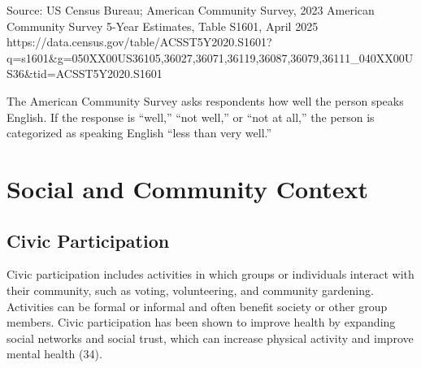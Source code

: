 \documentclass[
  english,
  letterpaper,
]{report}
\begin{document}
\begin{tcolorbox}[enhanced jigsaw, breakable, leftrule=.75mm, title=\textcolor{quarto-callout-note-color}{\faInfo}\hspace{0.5em}{Source}, bottomrule=.15mm, opacityback=0, left=2mm, colback=white, bottomtitle=1mm, coltitle=black, colbacktitle=quarto-callout-note-color!10!white, colframe=quarto-callout-note-color-frame, opacitybacktitle=0.6, toptitle=1mm, titlerule=0mm, arc=.35mm, rightrule=.15mm, toprule=.15mm]

Source: US Census Bureau; American Community Survey, 2023 American
Community Survey 5-Year Estimates, Table S1601, April 2025
https://data.census.gov/table/ACSST5Y2020.S1601?q=s1601\&g=050XX00US36105,36027,36071,36119,36087,36079,36111\_040XX00US36\&tid=ACSST5Y2020.S1601

\end{tcolorbox}

\begin{tcolorbox}[enhanced jigsaw, breakable, leftrule=.75mm, title=\textcolor{quarto-callout-note-color}{\faInfo}\hspace{0.5em}{Note}, bottomrule=.15mm, opacityback=0, left=2mm, colback=white, bottomtitle=1mm, coltitle=black, colbacktitle=quarto-callout-note-color!10!white, colframe=quarto-callout-note-color-frame, opacitybacktitle=0.6, toptitle=1mm, titlerule=0mm, arc=.35mm, rightrule=.15mm, toprule=.15mm]

The American Community Survey asks respondents how well the person
speaks English. If the response is ``well,'' ``not well,'' or ``not at
all,'' the person is categorized as speaking English ``less than very
well.''

\end{tcolorbox}

\section{Social and Community
Context}\label{social-and-community-context}

\subsection{Civic Participation}\label{civic-participation}

Civic participation includes activities in which groups or individuals
interact with their community, such as voting, volunteering, and
community gardening. Activities can be formal or informal and often
benefit society or other group members. Civic participation has been
shown to improve health by expanding social networks and social trust,
which can increase physical activity and improve mental health (34).
\end{document}
